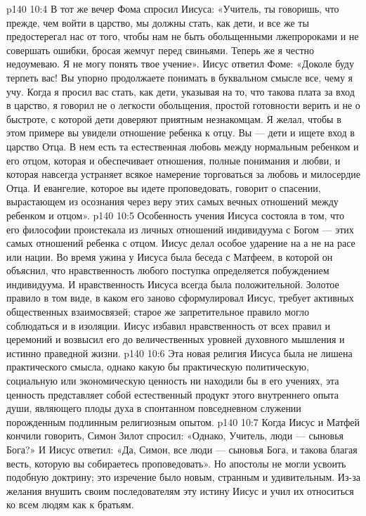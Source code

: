 \vs p140 10:4 \pc В тот же вечер Фома спросил Иисуса: «Учитель, ты говоришь, что прежде, чем войти в царство, мы должны стать, как дети, и все же ты предостерегал нас от того, чтобы нам не быть обольщенными лжепророками и не совершать ошибки, бросая жемчуг перед свиньями. Теперь же я честно недоумеваю. Я не могу понять твое учение». Иисус ответил Фоме: «Доколе буду терпеть вас! Вы упорно продолжаете понимать в буквальном смысле все, чему я учу. Когда я просил вас стать, как дети, указывая на то, что такова плата за вход в царство, я говорил не о легкости обольщения, простой готовности верить и не о быстроте, с которой дети доверяют приятным незнакомцам. Я желал, чтобы в этом примере вы увидели отношение ребенка к отцу. Вы --- дети и ищете вход в царство  Отца. В нем есть та естественная любовь между нормальным ребенком и его отцом, которая и обеспечивает отношения, полные понимания и любви, и которая навсегда устраняет всякое намерение торговаться за любовь и милосердие Отца. И евангелие, которое вы идете проповедовать, говорит о спасении, вырастающем из осознания через веру этих самых вечных отношений между ребенком и отцом».
\vs p140 10:5 \pc Особенность учения Иисуса состояла в том, что  его философии проистекала из личных отношений индивидуума с Богом --- этих самых отношений ребенка с отцом. Иисус делал особое ударение на  а не на расе или нации. Во время ужина у Иисуса была беседа с Матфеем, в которой он объяснил, что нравственность любого поступка определяется побуждением индивидуума. И нравственность Иисуса всегда была положительной. Золотое правило в том виде, в каком его заново сформулировал Иисус, требует активных общественных взаимосвязей; старое же запретительное правило могло соблюдаться и в изоляции. Иисус избавил нравственность от всех правил и церемоний и возвысил его до величественных уровней духовного мышления и истинно праведной жизни.
\vs p140 10:6 Эта новая религия Иисуса была не лишена практического смысла, однако какую бы практическую политическую, социальную или экономическую ценность ни находили бы в его учениях, эта ценность представляет собой естественный продукт этого внутреннего опыта души, являющего плоды духа в спонтанном повседневном служении порожденным подлинным религиозным опытом.
\vs p140 10:7 Когда Иисус и Матфей кончили говорить, Симон Зилот спросил: «Однако, Учитель,  люди --- сыновья Бога?» И Иисус ответил: «Да, Симон, все люди --- сыновья Бога, и такова благая весть, которую вы собираетесь проповедовать». Но апостолы не могли усвоить подобную доктрину; это изречение было новым, странным и удивительным. Из\hyp{}за желания внушить своим последователям эту истину Иисус и учил их относиться ко всем людям как к братьям.
